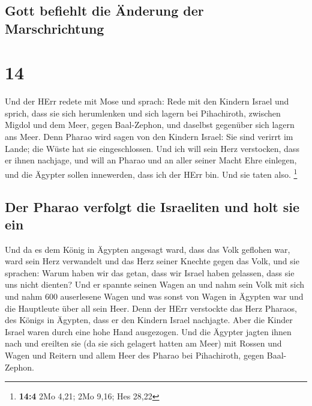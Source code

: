 \hypertarget{gott-befiehlt-die-uxe4nderung-der-marschrichtung}{%
\subsection{Gott befiehlt die Änderung der
Marschrichtung}\label{gott-befiehlt-die-uxe4nderung-der-marschrichtung}}

\hypertarget{section-13}{%
\section{14}\label{section-13}}

 Und der HErr redete mit Mose und sprach: 
Rede mit den Kindern Israel und sprich, dass sie sich herumlenken und
sich lagern bei Pihachiroth, zwischen Migdol und dem Meer, gegen
Baal-Zephon, und daselbst gegenüber sich lagern ans Meer. 
Denn Pharao wird sagen von den Kindern Israel: Sie sind verirrt im
Lande; die Wüste hat sie eingeschlossen.  Und ich will
sein Herz verstocken, dass er ihnen nachjage, und will an Pharao und an
aller seiner Macht Ehre einlegen, und die Ägypter sollen innewerden,
dass ich der HErr bin. Und sie taten also. \footnote{\textbf{14:4} 2Mo
  4,21; 2Mo 9,16; Hes 28,22}

\hypertarget{der-pharao-verfolgt-die-israeliten-und-holt-sie-ein}{%
\subsection{Der Pharao verfolgt die Israeliten und holt sie
ein}\label{der-pharao-verfolgt-die-israeliten-und-holt-sie-ein}}

 Und da es dem König in Ägypten angesagt ward, dass das
Volk geflohen war, ward sein Herz verwandelt und das Herz seiner Knechte
gegen das Volk, und sie sprachen: Warum haben wir das getan, dass wir
Israel haben gelassen, dass sie uns nicht dienten?  Und er
spannte seinen Wagen an und nahm sein Volk mit sich  und
nahm 600 auserlesene Wagen und was sonst von Wagen in Ägypten war und
die Hauptleute über all sein Heer.  Denn der HErr
verstockte das Herz Pharaos, des Königs in Ägypten, dass er den Kindern
Israel nachjagte. Aber die Kinder Israel waren durch eine hohe Hand
ausgezogen.  Und die Ägypter jagten ihnen nach und
ereilten sie (da sie sich gelagert hatten am Meer) mit Rossen und Wagen
und Reitern und allem Heer des Pharao bei Pihachiroth, gegen
Baal-Zephon.

